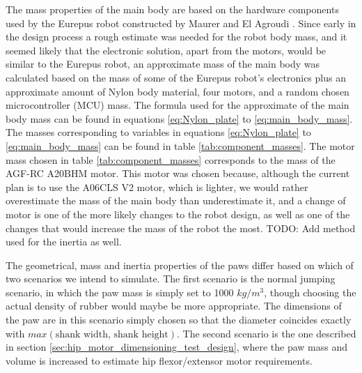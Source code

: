 The mass properties of the main body are based on the hardware components used by the Eurepus robot constructed by Maurer and El Agroudi \cite{finn_tarek_master}. Since early in the design process a rough estimate was needed for the robot body mass, and it seemed likely that the electronic solution, apart from the motors, would be similar to the Eurepus robot, an approximate mass of the main body was calculated based on the mass of some of the Eurepus robot's electronics plus an approximate amount of Nylon body material, four motors, and a random chosen microcontroller (MCU) mass. The formula used for the approximate of the main body mass can be found in equations \ref{eq:Nylon_plate} to \ref{eq:main_body_mass}. The masses corresponding to variables in equations \ref{eq:Nylon_plate} to \ref{eq:main_body_mass} can be found in table \ref{tab:component_masses}. The motor mass chosen in table \ref{tab:component_masses} corresponds to the mass of the AGF-RC A20BHM motor. This motor was chosen because, although the current plan is to use the A06CLS V2 motor, which is lighter, we would rather overestimate the mass of the main body than underestimate it, and a change of motor is one of the more likely changes to the robot design, as well as one of the changes that would increase the mass of the robot the most. TODO: Add method used for the inertia as well. 

The geometrical, mass and inertia properties of the paws differ based on which of two scenarios we intend to simulate. The first scenario is the normal jumping scenario, in which the paw mass is simply set to 1000 $kg/{m^3}$, though choosing the actual density of rubber would maybe be more appropriate. The dimensions of the paw are in this scenario simply chosen so that the diameter coincides exactly with $max(\text{shank width, shank height})$. The second scenario is the one described in section \ref{sec:hip_motor_dimensioning_test_design}, where the paw mass and volume is increased to estimate hip flexor/extensor motor requirements. 

